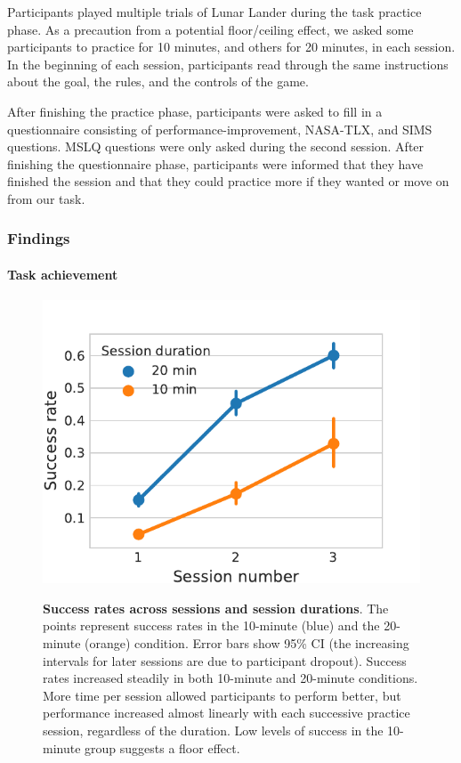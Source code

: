 Participants played multiple trials of Lunar Lander during the task practice phase. As a precaution from a potential floor/ceiling effect, we asked some participants to practice for 10 minutes, and others for 20 minutes, in each session. In the beginning of each session, participants read through the same instructions about the goal, the rules, and the controls of the game.

After finishing the practice phase, participants were asked to fill in a questionnaire consisting of performance-improvement, NASA-TLX, and \ac{SIMS} questions. \ac{MSLQ} questions were only asked during the second session. After finishing the questionnaire phase, participants were informed that they have finished the session and that they could practice more if they wanted or move on from our task.

\subsubsection{Findings}

\paragraph{Task achievement}

\begin{figure}[t]
    \centering
    {\includegraphics[width=.5\linewidth]{Figures/c5/success_rates.pdf}}
    \caption[]{\textbf{Success rates across sessions and session durations}. The points represent success rates in the 10-minute (blue) and the 20-minute (orange) condition. Error bars show 95\% \ac{CI} (the increasing intervals for later sessions are due to participant dropout). Success rates increased steadily in both 10-minute and 20-minute conditions. More time per session allowed participants to perform better, but performance increased almost linearly with each successive practice session, regardless of the duration. Low levels of success in the 10-minute group suggests a floor effect.}\label{fig:5-success_rates}
\end{figure}

